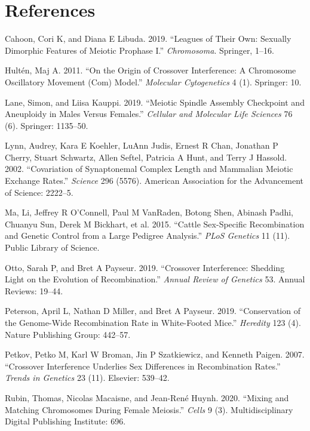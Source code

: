 \documentclass[]{article}
\begin{document}
\section*{References}\label{references}

\hypertarget{refs}{}
\hypertarget{ref-cahoonLibuda2019}{}
Cahoon, Cori K, and Diana E Libuda. 2019. ``Leagues of Their Own:
Sexually Dimorphic Features of Meiotic Prophase I.'' \emph{Chromosoma}.
Springer, 1--16.

\hypertarget{ref-hulten2011_COM}{}
Hultén, Maj A. 2011. ``On the Origin of Crossover Interference: A
Chromosome Oscillatory Movement (Com) Model.'' \emph{Molecular
Cytogenetics} 4 (1). Springer: 10.

\hypertarget{ref-laneKauppi2019}{}
Lane, Simon, and Liisa Kauppi. 2019. ``Meiotic Spindle Assembly
Checkpoint and Aneuploidy in Males Versus Females.'' \emph{Cellular and
Molecular Life Sciences} 76 (6). Springer: 1135--50.

\hypertarget{ref-lynn2002}{}
Lynn, Audrey, Kara E Koehler, LuAnn Judis, Ernest R Chan, Jonathan P
Cherry, Stuart Schwartz, Allen Seftel, Patricia A Hunt, and Terry J
Hassold. 2002. ``Covariation of Synaptonemal Complex Length and
Mammalian Meiotic Exchange Rates.'' \emph{Science} 296 (5576). American
Association for the Advancement of Science: 2222--5.

\hypertarget{ref-ma2015_cattle}{}
Ma, Li, Jeffrey R O'Connell, Paul M VanRaden, Botong Shen, Abinash
Padhi, Chuanyu Sun, Derek M Bickhart, et al. 2015. ``Cattle Sex-Specific
Recombination and Genetic Control from a Large Pedigree Analysis.''
\emph{PLoS Genetics} 11 (11). Public Library of Science.

\hypertarget{ref-ottoPaysuer2019}{}
Otto, Sarah P, and Bret A Payseur. 2019. ``Crossover Interference:
Shedding Light on the Evolution of Recombination.'' \emph{Annual Review
of Genetics} 53. Annual Reviews: 19--44.

\hypertarget{ref-peterson2019}{}
Peterson, April L, Nathan D Miller, and Bret A Payseur. 2019.
``Conservation of the Genome-Wide Recombination Rate in White-Footed
Mice.'' \emph{Heredity} 123 (4). Nature Publishing Group: 442--57.

\hypertarget{ref-petkov2007}{}
Petkov, Petko M, Karl W Broman, Jin P Szatkiewicz, and Kenneth Paigen.
2007. ``Crossover Interference Underlies Sex Differences in
Recombination Rates.'' \emph{Trends in Genetics} 23 (11). Elsevier:
539--42.

\hypertarget{ref-rubin2020mixing}{}
Rubin, Thomas, Nicolas Macaisne, and Jean-René Huynh. 2020. ``Mixing and
Matching Chromosomes During Female Meiosis.'' \emph{Cells} 9 (3).
Multidisciplinary Digital Publishing Institute: 696.
\end{document}
